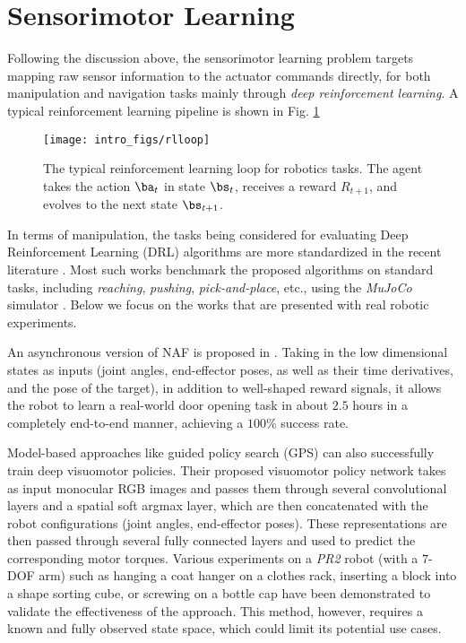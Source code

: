 \section{Sensorimotor Learning}
\label{sec:lb_sensorimotor}

Following the discussion above, the sensorimotor learning problem targets mapping raw sensor information to the actuator commands directly, for both manipulation and navigation tasks mainly through \textit{deep reinforcement learning}. A typical reinforcement learning pipeline is shown in Fig. \ref{fig:rlloop}

\begin{figure}[!ht]
   \centering
   \texttt{[image: intro\_figs/rlloop]}
    \caption{The typical reinforcement learning loop for robotics tasks.
    The agent takes the action $\ba_{t}$ in state $\bs_{t}$, receives a reward $R_{t+1}$, and evolves to the next state $\bs_{t+1}$.}
   \label{fig:rlloop}
\end{figure}

In terms of manipulation, the tasks being considered for evaluating Deep Reinforcement Learning (DRL) algorithms are more standardized in the recent literature \cite{heess2017emergence,lillicrap2015continuous,mnih2016asynchronous,schulman2015trust,wu2017scalable}.
Most such works benchmark the proposed algorithms on standard tasks,
including \textit{reaching}, \textit{pushing}, \textit{pick-and-place}, etc.,
using the \textit{MuJoCo} simulator \cite{todorov2012mujoco}.
Below we focus on the works that are presented with real robotic experiments.

An asynchronous version of NAF is proposed in \cite{gu2016deep}.
Taking in the low dimensional states as inputs (joint angles, end-effector poses, as well as their time derivatives, and the pose of the target),
in addition to well-shaped reward signals, it allows the robot to learn a real-world door opening task in about $2.5$ hours in a completely end-to-end manner,
achieving a $100\%$ success rate.

Model-based approaches like guided policy search (GPS)\cite{levine2016end} can also successfully train deep visuomotor policies.
Their proposed visuomotor policy network takes as input monocular RGB images and passes them through several convolutional layers and a spatial soft argmax layer,
which are then concatenated with the robot configurations (joint angles, end-effector poses).
These representations are then passed through several fully connected layers and used to predict the corresponding motor torques.
Various experiments on a \textit{PR2} robot (with a $7$-DOF arm)
such as hanging a coat hanger on a clothes rack,
inserting a block into a shape sorting cube,
or screwing on a bottle cap have been demonstrated to validate the effectiveness of the approach.
This method, however, requires a known and fully observed state space,
which could limit its potential use cases.

